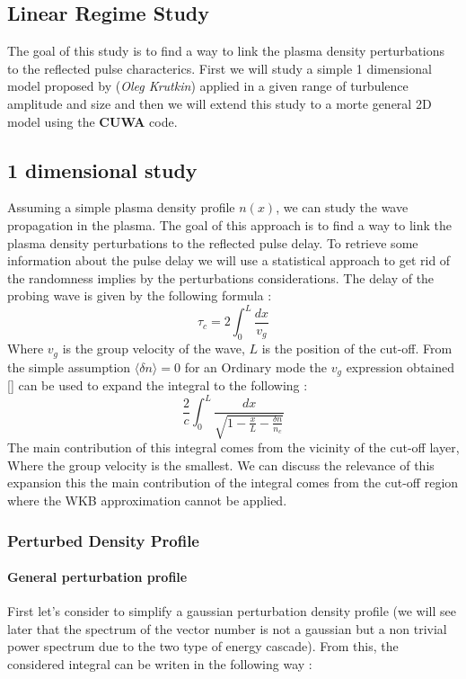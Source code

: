 \documentclass[11pt,a4paper,openany]{report}
\begin{document}
\begin{multicols}{2}
    \chapter{Linear Regime Study}
    The goal of this study is to find a way to link the plasma density perturbations to the reflected pulse characterics. First we will study a simple 1 dimensional model proposed by (\emph{Oleg Krutkin}) applied in a given range of turbulence amplitude and size and then we will extend this study to a morte general 2D model using the \textbf{CUWA} code.
    \section{1 dimensional study}
    Assuming a simple plasma density profile $n(x)$, we can study the wave propagation in the plasma. The goal of this approach is to find a way to link the plasma density perturbations to the reflected pulse delay. To retrieve some information about the pulse delay we will
    use a statistical approach to get rid of the randomness implies by the perturbations considerations.
    The delay of the probing wave is given by the following formula  : $$\tau_c = 2 \int_0^L \frac{dx}{v_g}$$ Where $v_g$ is the group velocity of the wave, $L$ is the position of the cut-off.
    From the simple assumption $\langle \delta n \rangle = 0 $ for an Ordinary mode the  $v_g$ expression obtained [] can be used to expand the integral to the following :
    $$\frac{2}{c} \int_0^L \frac{dx}{\sqrt{1 - \frac{x}{L} - \frac{\delta n }{n_c}}}$$ The main contribution of this integral comes from the vicinity of the cut-off layer, Where the group velocity is the smallest.
    We can discuss the relevance of this expansion this the main contribution of the integral comes from the cut-off region where the WKB approximation cannot be applied.

    \subsection{Perturbed Density Profile}
    \subsubsection{General perturbation profile}
    First let's consider to simplify a gaussian perturbation density profile (we will see later that the spectrum of the vector number is not a gaussian but a non trivial power spectrum due to the two type of energy cascade). From this, the considered integral can be writen in the following way :


\end{multicols}
\end{document}
